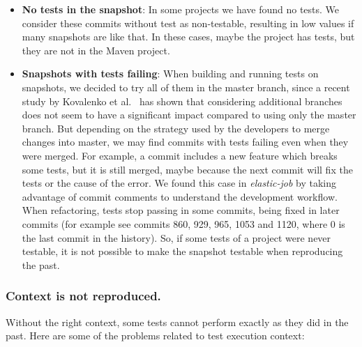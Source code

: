 \begin{itemize}
    \item  \textbf{No tests in the snapshot}: 
    In some projects we have found no tests. 
    We consider these commits without test as non-testable, resulting in low values if many snapshots are like that.
    In these cases, maybe the project has tests, but they are not in the Maven project.
    \item \textbf{Snapshots with tests failing}: 
    When building and running tests on snapshots, we decided to try all of them in the master branch, since a recent study by Kovalenko et al.~\cite{kovalenko:2018:miningfilehistories} has shown that considering additional branches does not seem to have a significant impact compared to using only the master branch. 
    But depending on the strategy used by the developers to merge changes into master, we may find commits with tests failing even when they were merged. 
    For example, a commit includes a new feature which breaks some tests, but it is still merged, maybe because the next commit will fix the tests or the cause of the error.
    We found this case in \textit{elastic-job} by taking advantage of commit comments to understand the development workflow. 
    When refactoring, tests stop passing in some commits, being fixed in later commits (for example see commits 860, 929, 965, 1053 and 1120, where 0 is the last commit in the history).
    So, if some tests of a project were never testable, it is not possible to make the snapshot testable when reproducing the past.
\end{itemize}

\subsubsection{Context is not reproduced.} 
Without the right context, some tests cannot perform exactly as they did in the past. Here are some of the problems related to test execution context:

